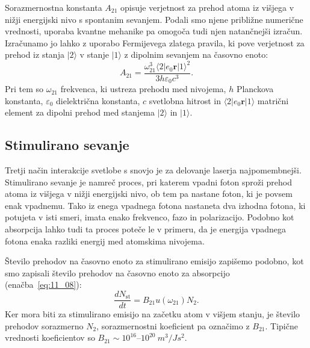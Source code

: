 \begin{remark}
Sorazmernostna konstanta $A_{21}$ opisuje verjetnost za prehod atoma 
iz višjega v nižji energijski nivo s spontanim sevanjem. Podali smo njene približne
numerične vrednosti, uporaba kvantne mehanike pa omogoča tudi njen natančnejši 
izračun. Izračunamo jo lahko z
uporabo Fermijevega zlatega pravila, ki pove verjetnost za prehod 
iz stanja $|2\rangle$ v stanje $|1\rangle$ z dipolnim sevanjem na časovno enoto: 
\begin{equation}
A_{21} = \frac{\omega_{21}^3 \langle 2|e_0\mathbf{r}|1\rangle^2}
{3h \varepsilon_0 c^3}.
\label{eq:11_11}
\end{equation} 
Pri tem so $\omega_{21}$ frekvenca, ki ustreza prehodu med nivojema, $h$ Planckova
konstanta, $\varepsilon_0$ dielektrična konstanta, $c$ svetlobna hitrost in 
$\langle 2|e_0\mathbf{r}|1\rangle$ matrični element za dipolni prehod med stanjema 
$|2\rangle$ in $|1\rangle$.
\end{remark}

\subsection*{Stimulirano sevanje}
Tretji način interakcije svetlobe s snovjo je za delovanje laserja
najpomembnejši. Stimulirano sevanje je namreč proces, pri katerem 
vpadni foton sproži prehod atoma iz višjega v nižji energijski nivo, 
ob tem pa nastane foton, ki je povsem enak vpadnemu.
Tako iz enega vpadnega fotona nastaneta dva izhodna fotona, ki potujeta
v isti smeri, imata enako frekvenco, fazo in polarizacijo. Podobno kot absorpcija
lahko tudi ta proces poteče le v primeru, da je energija vpadnega 
fotona enaka razliki energij med atomskima nivojema.

Število prehodov na časovno enoto za stimulirano emisijo zapišemo podobno, 
kot smo zapisali število prehodov na časovno enoto za absorpcijo 
(enačba~\ref{eq:11_08}): 
\begin{equation}
\frac{dN_\mathrm{st}}{dt} = B_{21}u(\omega_{21}) N_2.
\label{eq:11_12}
\end{equation}
Ker mora biti za stimulirano emisijo na začetku atom v višjem stanju, 
je število prehodov sorazmerno $N_2$, sorazmernostni koeficient pa 
označimo z $B_{21}$. Tipične vrednosti
koeficientov so $B_{21}\sim 10^{16}$--$10^{20}~\si{m^3/Js^2}$.

